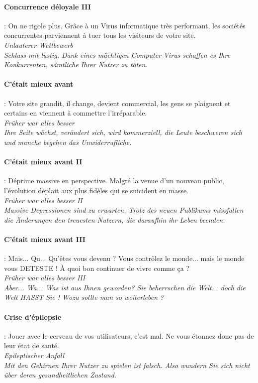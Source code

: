 \documentclass[10pt,a4paper]{article}
\begin{document}
\paragraph{Concurrence déloyale III} : On ne rigole plus. Grâce à un Virus informatique très performant, les sociétés concurrentes parviennent à tuer tous les visiteurs de votre site.\\
\textit{Unlauterer Wettbewerb}\\
\textit{Schluss mit lustig. Dank eines mächtigen Computer-Virus schaffen es Ihre Konkurrenten, sämtliche Ihrer Nutzer zu töten.}


\paragraph{C'était mieux avant} : Votre site grandit, il change, devient commercial, les gens se plaignent et certains en viennent à commettre l'irréparable.\\
\textit{Früher war alles besser}\\
\textit{Ihre Seite wächst, verändert sich, wird kommerziell, die Leute beschweren sich und manche begehen das Unwiderrufliche.}


\paragraph{C'était mieux avant II} : Déprime massive en perspective. Malgré la venue d'un nouveau public, l'évolution déplait aux plus fidèles qui se suicident en masse.\\
\textit{Früher war alles besser II}\\
\textit{Massive Depressionen sind zu erwarten. Trotz des neuen Publikums missfallen die Änderungen den treuesten Nutzern, die daraufhin ihr Leben beenden.}


\paragraph{C'était mieux avant III} : Mais... Qu... Qu'êtes vous devenu ? Vous contrôlez le monde... mais le monde vous DETESTE ! À quoi bon continuer de vivre comme ça ?\\
\textit{Früher war alles besser III}\\
\textit{Aber... Wa... Was ist aus Ihnen geworden? Sie beherrschen die Welt... doch die Welt HASST Sie ! Wozu sollte man so weiterleben ?}


\paragraph{Crise d’épilepsie} : Jouer avec le cerveau de vos utilisateurs, c'est mal. Ne vous étonnez donc pas de leur état de santé.\\
\textit{Epileptischer Anfall}\\
\textit{Mit den Gehirnen Ihrer Nutzer zu spielen ist falsch. Also wundern Sie sich nicht über deren gesundheitlichen Zustand.}
\end{document}

